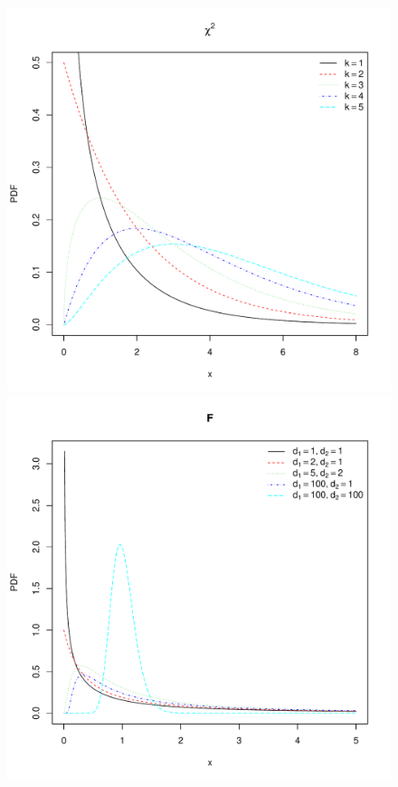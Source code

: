 \documentclass[landscape]{article}
\begin{document}
\begin{figure}[H]
  \includegraphics[scale=0.35]{figs/chisquare.pdf}
  \includegraphics[scale=0.35]{figs/f.pdf}

\end{figure}
\end{document}
